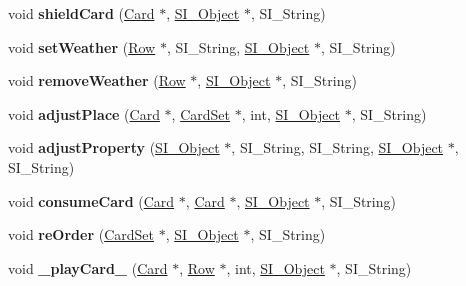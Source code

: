 \begin{DoxyCompactItemize}
\item 
\mbox{\label{class_field_ae43b9422c5e01576c6d117e793b26f91}} 
void {\bfseries shield\+Card} (\hyperlink{class_card}{Card} $\ast$, \hyperlink{class_s_i___object}{S\+I\+\_\+\+Object} $\ast$, S\+I\+\_\+\+String)
\item 
\mbox{\label{class_field_a93a4eed5ef9b0e588673a7e666581757}} 
void {\bfseries set\+Weather} (\hyperlink{class_card_set}{Row} $\ast$, S\+I\+\_\+\+String, \hyperlink{class_s_i___object}{S\+I\+\_\+\+Object} $\ast$, S\+I\+\_\+\+String)
\item 
\mbox{\label{class_field_a408bbb92b47a5313cb5346894de1a9e0}} 
void {\bfseries remove\+Weather} (\hyperlink{class_card_set}{Row} $\ast$, \hyperlink{class_s_i___object}{S\+I\+\_\+\+Object} $\ast$, S\+I\+\_\+\+String)
\item 
\mbox{\label{class_field_a40afca2daf1b14ab08420ef6bb6616e6}} 
void {\bfseries adjust\+Place} (\hyperlink{class_card}{Card} $\ast$, \hyperlink{class_card_set}{Card\+Set} $\ast$, int, \hyperlink{class_s_i___object}{S\+I\+\_\+\+Object} $\ast$, S\+I\+\_\+\+String)
\item 
\mbox{\label{class_field_ace9f350fe257860d830198df950ab100}} 
void {\bfseries adjust\+Property} (\hyperlink{class_s_i___object}{S\+I\+\_\+\+Object} $\ast$, S\+I\+\_\+\+String, S\+I\+\_\+\+String, \hyperlink{class_s_i___object}{S\+I\+\_\+\+Object} $\ast$, S\+I\+\_\+\+String)
\item 
\mbox{\label{class_field_a457b0b2e8f5eddd82db8afc52a4bdd01}} 
void {\bfseries consume\+Card} (\hyperlink{class_card}{Card} $\ast$, \hyperlink{class_card}{Card} $\ast$, \hyperlink{class_s_i___object}{S\+I\+\_\+\+Object} $\ast$, S\+I\+\_\+\+String)
\item 
\mbox{\label{class_field_aa0111daa5319b4b8da3da663ba75e3e4}} 
void {\bfseries re\+Order} (\hyperlink{class_card_set}{Card\+Set} $\ast$, \hyperlink{class_s_i___object}{S\+I\+\_\+\+Object} $\ast$, S\+I\+\_\+\+String)
\item 
\mbox{\label{class_field_a725caffc2e4707f0885ad06ee59e25ec}} 
void {\bfseries \+\_\+play\+Card\+\_\+} (\hyperlink{class_card}{Card} $\ast$, \hyperlink{class_card_set}{Row} $\ast$, int, \hyperlink{class_s_i___object}{S\+I\+\_\+\+Object} $\ast$, S\+I\+\_\+\+String)

\end{DoxyCompactItemize}
